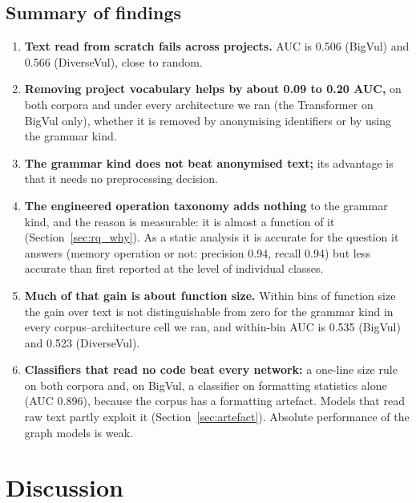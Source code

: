 \documentclass[pdflatex,sn-basic]{sn-jnl}
\theoremstyle{thmstyleone}%
\newcommand{\mBvGgnnKindSs}{0.535}
\newcommand{\mBvGgnnLexAuc}{0.506}
\newcommand{\mDvGgnnKindSs}{0.523}
\newcommand{\mDvGgnnLexAuc}{0.566}
\newcommand{\numdeltaMax}{0.20}
\newcommand{\numdeltaMin}{0.09}
\newcommand{\numpooledMemopP}{0.94}
\newcommand{\numpooledMemopR}{0.94}
\newcommand{\rBvFormatAuc}{0.896}
\begin{document}
\subsection{Summary of findings}
\label{sec:summary}

\begin{enumerate}
    \item \textbf{Text read from scratch fails across projects.} AUC is
          \mBvGgnnLexAuc{} (BigVul) and \mDvGgnnLexAuc{} (DiverseVul), close to
          random.
    \item \textbf{Removing project vocabulary helps by about \numdeltaMin{} to \numdeltaMax{} AUC,}
          on both corpora and under every architecture we ran (the Transformer on
          BigVul only), whether it is removed
          by anonymising identifiers or by using the grammar kind.
    \item \textbf{The grammar kind does not beat anonymised text;} its advantage
          is that it needs no preprocessing decision.
    \item \textbf{The engineered operation taxonomy adds nothing} to the grammar
          kind, and the reason is measurable: it is almost a function of it
          (Section~\ref{sec:rq_why}). As a static analysis it is accurate for the
          question it answers (memory operation or not: precision
          \numpooledMemopP{}, recall \numpooledMemopR{}) but less accurate than
          first reported at the level of individual classes.
    \item \textbf{Much of that gain is about function size.} Within bins of
          function size the gain over text is not distinguishable from zero for
          the grammar kind in every corpus--architecture cell we ran, and within-bin AUC is \mBvGgnnKindSs{} (BigVul) and
          \mDvGgnnKindSs{} (DiverseVul).
    \item \textbf{Classifiers that read no code beat every network:} a
          one-line size rule on both corpora and, on BigVul, a classifier on
          formatting statistics alone (AUC \rBvFormatAuc{}), because the corpus
          has a formatting artefact. Models that read raw text partly exploit
          it (Section~\ref{sec:artefact}). Absolute performance of the graph
          models is weak.
\end{enumerate}


\section{Discussion}
\label{sec:discussion}
\end{document}
